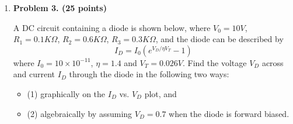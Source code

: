 \begin{enumerate}
% 
% 

\item {\bf Problem 3. (25 points)} 

A DC circuit containing a diode is shown below, where $V_0=10V$, $R_1=0.1K\Omega$,
$R_2=0.6K\Omega$, $R_3=0.3K\Omega$, and the diode can be described by
\[ I_D=I_0 ( e^{V_D/\eta V_T}-1 ) \]
where $I_0=10\times 10^{-11}$, $\eta=1.4$ and $V_T=0.026V$. Find the voltage 
$V_D$ across and current $I_D$ through the diode in the following two ways:
\begin{itemize}
\item (1) graphically on the $I_D$ vs. $V_D$ plot, and
\item (2) algebraically by assuming $V_D=0.7$ when the diode is forward biased.
\end{itemize}


\end{enumerate}

